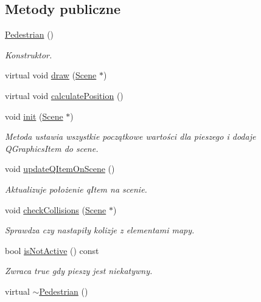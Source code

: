\subsection*{Metody publiczne}
\begin{DoxyCompactItemize}
\item 
\hyperlink{class_pedestrian_acfccb3ad264cab78cf0efe3b2f1f9fc2}{Pedestrian} ()
\begin{DoxyCompactList}\small\item\em Konstruktor. \end{DoxyCompactList}\item 
virtual void \hyperlink{class_pedestrian_a51d926e2af8c607afef85f5e4d169a7a}{draw} (\hyperlink{class_scene}{Scene} $\ast$)
\item 
virtual void \hyperlink{class_pedestrian_aa7a2be507acde572507e185dc27eb6ec}{calculate\-Position} ()
\item 
void \hyperlink{class_pedestrian_ac53bd29d69fbe51c1d51064311ef36cc}{init} (\hyperlink{class_scene}{Scene} $\ast$)
\begin{DoxyCompactList}\small\item\em Metoda ustawia wszystkie początkowe wartości dla pieszego i dodaje Q\-Graphics\-Item do scene. \end{DoxyCompactList}\item 
void \hyperlink{class_pedestrian_a6244722d6aab61d21e2d1d9cd9152bd9}{update\-Q\-Item\-On\-Scene} ()
\begin{DoxyCompactList}\small\item\em Aktualizuje położenie q\-Item na scenie. \end{DoxyCompactList}\item 
void \hyperlink{class_pedestrian_a746a42831de03e17e5a15ab8066d14cf}{check\-Collisions} (\hyperlink{class_scene}{Scene} $\ast$)
\begin{DoxyCompactList}\small\item\em Sprawdza czy nastapiły kolizje z elementami mapy. \end{DoxyCompactList}\item 
bool \hyperlink{class_pedestrian_a74387251ec5d3eae4a14e5e87478282d}{is\-Not\-Active} () const 
\begin{DoxyCompactList}\small\item\em Zwraca true gdy pieszy jest niekatywny. \end{DoxyCompactList}\item 
virtual \hyperlink{class_pedestrian_af942446f2f37420c967fff3158e81e21}{$\sim$\-Pedestrian} ()
\end{DoxyCompactItemize}
